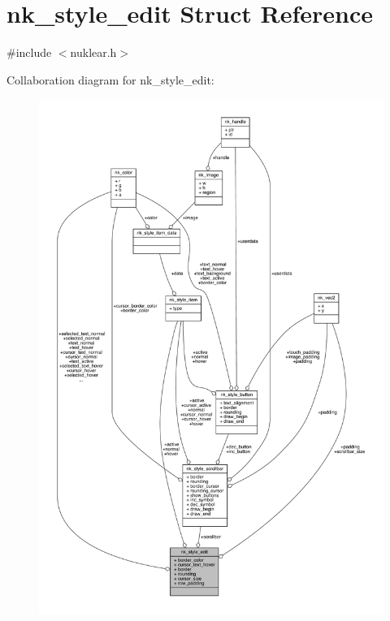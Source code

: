 \hypertarget{structnk__style__edit}{}\section{nk\+\_\+style\+\_\+edit Struct Reference}
\label{structnk__style__edit}


{\ttfamily \#include $<$nuklear.\+h$>$}



Collaboration diagram for nk\+\_\+style\+\_\+edit\+:
\nopagebreak
\begin{figure}[H]
\begin{center}
\leavevmode
\includegraphics[width=350pt]{structnk__style__edit__coll__graph}
\end{center}
\end{figure}
